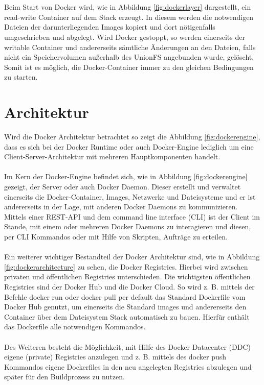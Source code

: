 \\\\
Beim Start von Docker wird, wie in Abbildung \ref{fig:dockerlayer} dargestellt, ein read-write Container auf dem Stack erzeugt. In diesem werden die notwendigen Dateien der darunterliegenden Images kopiert und dort nötigenfalls umgeschrieben und abgelegt. Wird Docker gestoppt, so werden einerseits der writable Container und andererseits sämtliche Änderungen an den Dateien, falls nicht ein Speichervolumen außerhalb des UnionFS angebunden wurde, gelöscht. Somit ist es möglich, die Docker-Container immer zu den gleichen Bedingungen zu starten.
\section{Architektur}
\label{c:architektur}
Wird die Docker Architektur betrachtet so zeigt die Abbildung \ref{fig:dockerengine}, dass es sich bei der Docker Runtime oder auch Docker-Engine lediglich um eine Client-Server-Architektur mit mehreren Hauptkomponenten handelt.
\\\\
Im Kern der Docker-Engine befindet sich, wie in Abbildung \ref{fig:dockerengine} gezeigt, der Server oder auch Docker Daemon. Dieser erstellt und verwaltet einerseits die Docker-Container, Images, Netzwerke und Dateisysteme und er ist andererseits in der Lage, mit anderen Docker Daemons zu kommunizieren. Mittels einer REST-API und dem command line interface (CLI) ist der Client im Stande, mit einem oder mehreren Docker Daemons zu interagieren und diesen, per CLI Kommandos oder mit Hilfe von Skripten, Aufträge zu erteilen.
\\\\
Ein weiterer wichtiger Bestandteil der Docker Architektur sind, wie in Abbildung \ref{fig:dockerarchitecture} zu sehen, die Docker Registries. Hierbei wird zwischen privaten und öffentlichen Registries unterschieden. Die wichtigsten öffentlichen Registries sind der Docker Hub und die Docker Cloud. So wird z. B. mittels der Befehle docker run oder docker pull per default das Standard Dockerfile vom Docker Hub genutzt, um einerseits die Standard images und andererseits den Container über dem Dateisystem Stack automatisch zu bauen. Hierfür enthält das Dockerfile alle notwendigen Kommandos.
\\\\
Des Weiteren besteht die Möglichkeit, mit Hilfe des Docker Datacenter (DDC) eigene (private) Registries anzulegen und z. B. mittels des docker push Kommandos eigene Dockerfiles in den neu angelegten Registries abzulegen und später für den Buildprozess zu nutzen.

